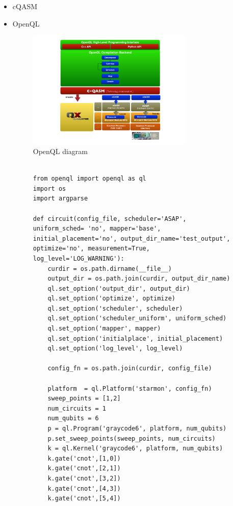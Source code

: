 \begin{itemize}
\item cQASM
\label{sec:orgba16aa8}


\item OpenQL
\label{sec:orgf0c24e9}

\begin{figure}[htbp]
\centering
\includegraphics[width=0.75\textwidth]{figures/openql.png}
\caption{\label{fig:org3daa34f}
OpenQL diagram}
\end{figure}

\begin{figure}
\centering
\begin{minipage}{\textwidth}

\begin{verbatim}

from openql import openql as ql
import os
import argparse

def circuit(config_file, scheduler='ASAP', uniform_sched= 'no', mapper='base', initial_placement='no', output_dir_name='test_output', optimize='no', measurement=True, log_level='LOG_WARNING'):
    curdir = os.path.dirname(__file__)
    output_dir = os.path.join(curdir, output_dir_name)
    ql.set_option('output_dir', output_dir)
    ql.set_option('optimize', optimize)
    ql.set_option('scheduler', scheduler)
    ql.set_option('scheduler_uniform', uniform_sched)
    ql.set_option('mapper', mapper)
    ql.set_option('initialplace', initial_placement)
    ql.set_option('log_level', log_level)

    config_fn = os.path.join(curdir, config_file)

    platform  = ql.Platform('starmon', config_fn)
    sweep_points = [1,2]
    num_circuits = 1
    num_qubits = 6
    p = ql.Program('graycode6', platform, num_qubits)
    p.set_sweep_points(sweep_points, num_circuits)
    k = ql.Kernel('graycode6', platform, num_qubits)
    k.gate('cnot',[1,0])
    k.gate('cnot',[2,1])
    k.gate('cnot',[3,2])
    k.gate('cnot',[4,3])
    k.gate('cnot',[5,4])


\end{verbatim}
\end{minipage}
\end{figure}
\end{itemize}
